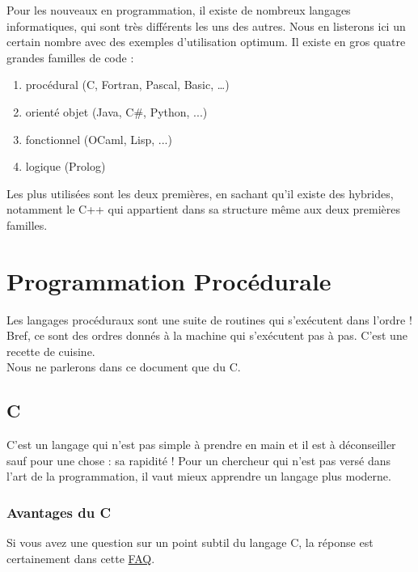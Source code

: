 
Pour les nouveaux en programmation, il existe de nombreux langages informatiques, qui sont très 
différents les uns des autres. Nous en listerons ici un certain nombre avec des exemples d'utilisation 
optimum. Il existe en gros quatre grandes familles de code :

\begin{enumerate}
\item procédural (C, Fortran, Pascal, Basic, \ldots)
\item orienté objet (Java, C\#, Python, ...)
\item fonctionnel (OCaml, Lisp, ...)
\item logique (Prolog)
\end{enumerate}

Les plus utilisées sont les deux premières, en sachant qu'il existe des hybrides, notamment le C++ 
qui appartient dans sa structure même aux deux premières familles. 

\section{Programmation Procédurale}

Les langages procéduraux sont une suite de routines qui s'exécutent dans l'ordre ! Bref, ce sont des ordres 
donnés à la machine qui s'exécutent pas à pas. C'est une recette de cuisine.\\

Nous ne parlerons dans ce document que du C. 

\subsection{C}

C'est un langage qui n'est pas simple à prendre en main et il est \`a déconseiller sauf pour 
une chose : sa rapidité ! Pour un chercheur qui n'est pas versé dans l'art de la programmation,
il vaut mieux apprendre un langage plus moderne.

\subsubsection*{Avantages du C}
 Si vous avez une question sur un point subtil du langage C, la réponse est certainement dans cette 
 \href{http://c-faq.com/}{FAQ}.
 
 
 
